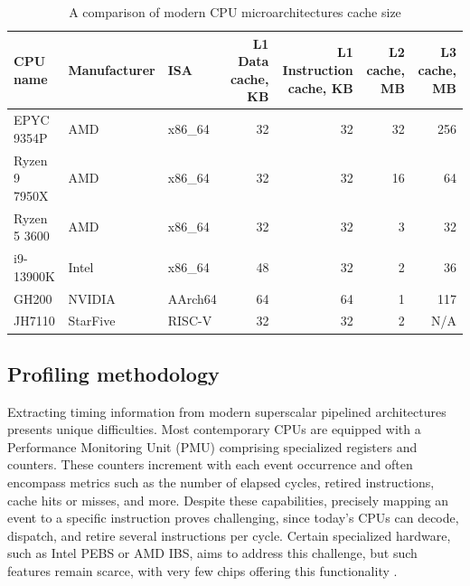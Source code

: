 \begin{table}[!t]
        \renewcommand{\arraystretch}{1.3}
        \caption{A comparison of modern CPU microarchitectures cache size}
        \centering
	\begin{tabular}{lllrrrr}
	        \hline
		CPU name      & Manufacturer & ISA     & L1 Data cache, KB                        & L1 Instruction cache, KB & L2 cache, MB & L3 cache, MB \\
		\hline
		EPYC 9354P    & AMD          & x86\_64 & 32                                       & 32                       & 32           & 256          \\
		Ryzen 9 7950X & AMD          & x86\_64 & 32                                       & 32                       & 16           & 64           \\
		Ryzen 5 3600  & AMD          & x86\_64 & 32                                       & 32                       & 3            & 32           \\
		i9-13900K     & Intel        & x86\_64 & 48                                       & 32                       & 2            & 36           \\
		GH200         & NVIDIA       & AArch64 & 64                                       & 64                       & 1            & 117          \\
		JH7110        & StarFive     & RISC-V  & 32                                       & 32                       & 2            & N/A
	\end{tabular}
        \label{tab:caches}
\end{table}

\subsection{Profiling methodology}

Extracting timing information from modern superscalar pipelined architectures presents unique difficulties.
Most contemporary CPUs are equipped with a Performance Monitoring Unit (PMU) comprising specialized registers
and counters. These counters increment with each event occurrence and often encompass metrics such as the 
number of elapsed cycles, retired instructions, cache hits or misses, and more. Despite these capabilities, 
precisely mapping an event to a specific instruction proves challenging, since today's CPUs can decode, 
dispatch, and retire several instructions per cycle. Certain specialized hardware, such as Intel PEBS or 
AMD IBS, aims to address this challenge, but such features remain scarce, with very few chips offering this 
functionality \cite{bakhvalovPerformanceAnalysisTuning2020}.

